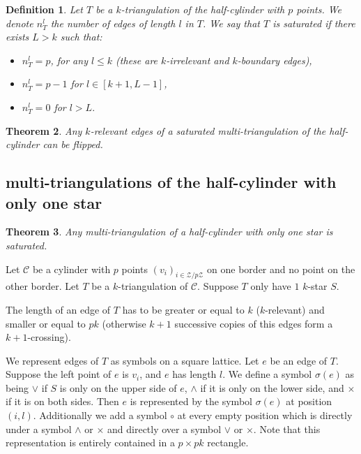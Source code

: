 \documentclass{amsart}
\newtheorem{theorem}{Theorem}[section]
\newtheorem{definition}[theorem]{Definition}
\theoremstyle{remark}
\newcommand{\darkblue}{\color{darkblue}} %
\newcommand{\defn}[1]{\textsl{\darkblue #1}} %
\newcommand*{\ktg}[0]{$k$-triangulation\xspace}
\begin{document}
\begin{definition}
Let $T$ be a \ktg of the half-cylinder with $p$ points. We denote $n_T^l$ the number of edges of length $l$ in $T$. We say that $T$ is \defn{saturated} if there exists $L>k$ such that:
\begin{itemize}
\item $n_T^l=p$, for any $l\leq k$ (these are $k$-irrelevant and $k$-boundary edges),
\item $n_T^l=p-1$ for $l\in[k+1,L-1]$,
\item $n_T^l=0$ for $l>L.$ 
\end{itemize}
\end{definition}

\begin{theorem}
\label{thm:flipSaturated}
Any $k$-relevant edges of a saturated multi-triangulation of the half-cylinder can be flipped.
\end{theorem}


\subsection{multi-triangulations of the half-cylinder with only one star}

\begin{theorem}\label{thm:uniStarSaturated}
Any multi-triangulation of a half-cylinder with only one star is saturated.
\end{theorem} 

Let $\mathcal{C}$ be a cylinder with $p$ points $(v_i)_{i\in\mathcal{Z}/p\mathcal{Z}}$ on one border and no point on the other border. Let $T$ be a $k$-triangulation of $\mathcal{C}$. Suppose $T$ only have $1$ $k$-star $S$.

The length of an edge of $T$ has to be greater or equal to $k$ ($k$-relevant) and smaller or equal to $pk$ (otherwise $k+1$ successive copies of this edges 
form a $k+1$-crossing).

We represent edges of $T$ as symbols on a square lattice.
Let $e$ be an edge of $T$. Suppose the left point of $e$ is $v_i$, and $e$ has length $l$. 
We define a symbol $\sigma(e)$ as being $\vee$ if $S$ is only on the upper side of $e$, $\wedge$ if it is only on the lower side, and $\times$ if it is on both sides.
Then $e$ is represented by the symbol $\sigma(e)$ at position $(i,l)$.
Additionally we add a symbol $\circ$ at every empty position which is directly under a symbol $\wedge$ or $\times$ and directly over a symbol $\vee$ or $\times$.
Note that this representation is entirely contained in a $p\times pk$ rectangle.
\end{document}
